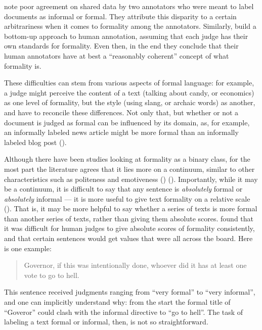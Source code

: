 \cite{lahiri2011informality} note poor agreement on shared data by two annotators who were meant to label documents as informal or formal. They attribute this disparity to a certain arbitrariness when it comes to formality among the annotators. Similarly, \cite{pavlick2016empirical} build a bottom-up approach to human annotation, assuming that each judge has their own standards for formality. Even then, in the end they conclude that their human annotators have at best a ``reasonably coherent'' concept of what formality is.

These difficulties can stem from various aspects of formal language: for example, a judge might perceive the content of a text (talking about candy, or economics) as one level of formality, but the style (using slang, or archaic words) as another, and have to reconcile these differences. Not only that, but whether or not a document is judged as formal can be influenced by its domain, as, for example, an informally labeled news article might be more formal than an informally labeled blog post (\cite{pavlick2016empirical}).

Although there have been studies looking at formality as a binary class, for the most part the literature agrees that it lies more on a continuum, similar to other characteristics such as politeness and emotiveness (\cite{pavlick2016empirical}) (\cite{lahiri2011informality}). Importantly, while it may be a continuum, it is difficult to say that any sentence is \textit{absolutely} formal or \textit{absolutely} informal --- it is more useful to give text formality on a relative scale (\cite{heylighen1999formality}). That is, it may be more helpful to say whether a series of texts is more formal than another series of texts, rather than giving them absolute scores. \cite{pavlick2016empirical} found that it was difficult for human judges to give absolute scores of formality consistently, and that certain sentences would get values that were all across the board. Here is one example:

\begin{quote}
Governor, if this was intentionally done, whoever did it has at least one vote to go to hell.
\linebreak {}
\end{quote}

This sentence received judgments ranging from ``very formal'' to ``very informal'', and one can implicitly understand why: from the start the formal title of ``Goveror'' could clash with the informal directive to ``go to hell''. The task of labeling a text formal or informal, then, is not so straightforward.

